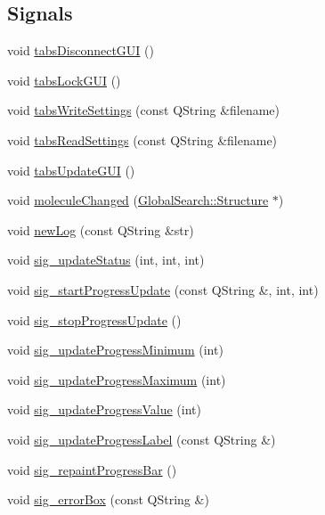 \subsection*{Signals}
\begin{DoxyCompactItemize}
\item 
void \hyperlink{classGlobalSearch_1_1AbstractDialog_a3557cb9d441d0aabbd9ee3aa8cfdaea9}{tabs\-Disconnect\-G\-U\-I} ()
\item 
void \hyperlink{classGlobalSearch_1_1AbstractDialog_a93ef632734bcb7228216f5685e90e3f1}{tabs\-Lock\-G\-U\-I} ()
\item 
void \hyperlink{classGlobalSearch_1_1AbstractDialog_a17e7f95159cbbf74b44739636271bc59}{tabs\-Write\-Settings} (const Q\-String \&filename)
\item 
void \hyperlink{classGlobalSearch_1_1AbstractDialog_aac4850039323bd7bf05f048bc7e8437e}{tabs\-Read\-Settings} (const Q\-String \&filename)
\item 
void \hyperlink{classGlobalSearch_1_1AbstractDialog_aea96d15a1dcd0715e4cd2b4377f052d0}{tabs\-Update\-G\-U\-I} ()
\item 
void \hyperlink{classGlobalSearch_1_1AbstractDialog_ac9ca934578ad9620bf49b9074a2b6982}{molecule\-Changed} (\hyperlink{classGlobalSearch_1_1Structure}{Global\-Search\-::\-Structure} $\ast$)
\item 
void \hyperlink{classGlobalSearch_1_1AbstractDialog_a94fdb4c5a3ec5963f2764f0d821b2583}{new\-Log} (const Q\-String \&str)
\item 
void \hyperlink{classGlobalSearch_1_1AbstractDialog_a99f0d05314c6da0ceb54cac2fd911c00}{sig\-\_\-update\-Status} (int, int, int)
\item 
void \hyperlink{classGlobalSearch_1_1AbstractDialog_a85a70ecb4d340cfeae15c18f69419827}{sig\-\_\-start\-Progress\-Update} (const Q\-String \&, int, int)
\item 
void \hyperlink{classGlobalSearch_1_1AbstractDialog_a738c3769545f233bb38b45a4724d527d}{sig\-\_\-stop\-Progress\-Update} ()
\item 
void \hyperlink{classGlobalSearch_1_1AbstractDialog_ab4aa18927ac8220ed98cdd6367eb1416}{sig\-\_\-update\-Progress\-Minimum} (int)
\item 
void \hyperlink{classGlobalSearch_1_1AbstractDialog_a8eb81a20fe5ad425482d3400d868fa16}{sig\-\_\-update\-Progress\-Maximum} (int)
\item 
void \hyperlink{classGlobalSearch_1_1AbstractDialog_adac485f7c7d5ac013a12b183a814da95}{sig\-\_\-update\-Progress\-Value} (int)
\item 
void \hyperlink{classGlobalSearch_1_1AbstractDialog_a4201bb13ca8322d5031ad7065d9f4afd}{sig\-\_\-update\-Progress\-Label} (const Q\-String \&)
\item 
void \hyperlink{classGlobalSearch_1_1AbstractDialog_a171b7b488362e506ba05e1016d3de0b0}{sig\-\_\-repaint\-Progress\-Bar} ()
\item 
void \hyperlink{classGlobalSearch_1_1AbstractDialog_a3d14409c0c74cea8b4b3e32e3a9eb7d0}{sig\-\_\-error\-Box} (const Q\-String \&)
\end{DoxyCompactItemize}
